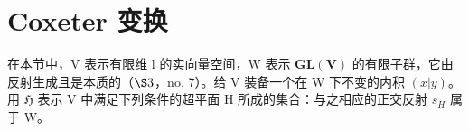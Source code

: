 \section{Coxeter 变换}

在本节中，V 表示有限维 l 的实向量空间，W 表示 \(\mathbf{GL}(\mathbf{V})\) 的有限子群，它由反射生成且是本质的（\(\S3\)，no. 7）。给 V 装备一个在 W 下不变的内积 \((x|y)\)。用 \(\mathfrak{H}\) 表示 V 中满足下列条件的超平面 H 所成的集合：与之相应的正交反射 \(s_{H}\) 属于 W。

